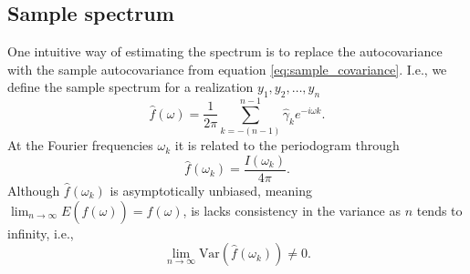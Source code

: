 \documentclass[a4paper]{memoir}
\theoremstyle{plain}
\theoremstyle{definition}
\theoremstyle{remark}
\begin{document}
\subsection{Sample spectrum}
One intuitive way of estimating the spectrum is to replace the autocovariance with the sample autocovariance from equation \eqref{eq:sample_covariance}.
I.e., we define the sample spectrum for a realization $y_1, y_2,  \hdots, y_n$
\begin{equation}\label{eq:sample_spectrum}
        \hat{f}(\omega) = \frac{1}{2\pi}\sum_{k = -(n - 1)}^{n-1}\hat{\gamma}_k e^{-i\omega k}.
\end{equation}
At the Fourier frequencies $\omega_k$ it is related to the periodogram through \cite{wei}
\begin{equation*}
        \hat{f}(\omega_k) = \frac{I(\omega_k)}{4 \pi}.
\end{equation*}
Although $\hat{f}(\omega_k)$ is asymptotically unbiased, meaning $\lim_{n \rightarrow \infty} E(\hat{f}(\omega)) = f(\omega)$, is lacks consistency in the variance as $n$ tends to infinity, i.e.,
\begin{equation*}
        \lim_{n \rightarrow \infty} \text{Var}(\hat{f}(\omega_k)) \neq 0.
\end{equation*}
\end{document}
